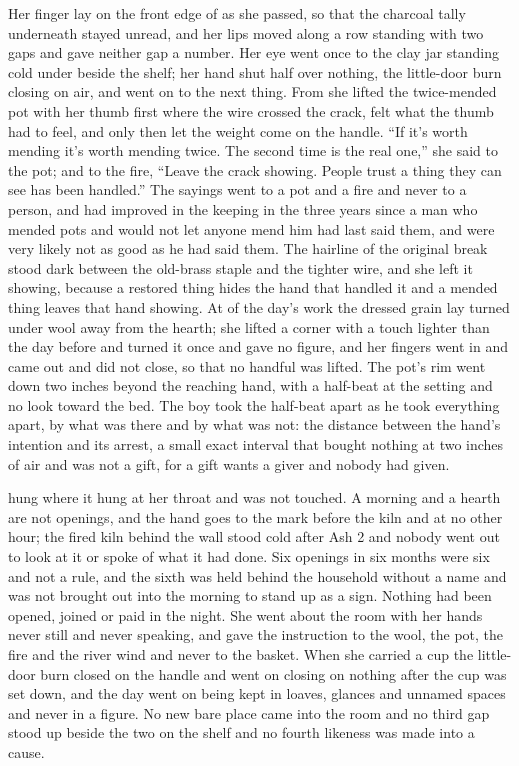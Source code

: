 Her finger lay on the front edge of  as she passed, so that the charcoal tally underneath stayed unread, and her lips moved along a row standing with two gaps and gave neither gap a number. Her eye went once to the clay jar standing cold under  beside the shelf; her hand shut half over nothing, the little-door burn closing on air, and went on to the next thing. From  she lifted the twice-mended pot with her thumb first where the wire crossed the crack, felt what the thumb had to feel, and only then let the weight come on the handle. “If it's worth mending it's worth mending twice. The second time is the real one,” she said to the pot; and to the fire, “Leave the crack showing. People trust a thing they can see has been handled.” The sayings went to a pot and a fire and never to a person, and had improved in the keeping in the three years since a man who mended pots and would not let anyone mend him had last said them, and were very likely not as good as he had said them. The hairline of the original break stood dark between the old-brass staple and the tighter wire, and she left it showing, because a restored thing hides the hand that handled it and a mended thing leaves that hand showing. At  of the day's work the dressed grain lay turned under wool away from the hearth; she lifted a corner with a touch lighter than the day before and turned it once and gave no figure, and her fingers went in and came out and did not close, so that no handful was lifted. The pot's rim went down two inches beyond the reaching hand, with a half-beat at the setting and no look toward the bed. The boy took the half-beat apart as he took everything apart, by what was there and by what was not: the distance between the hand's intention and its arrest, a small exact interval that bought nothing at two inches of air and was not a gift, for a gift wants a giver and nobody had given.

 hung where it hung at her throat and was not touched. A morning and a hearth are not openings, and the hand goes to the mark before the kiln and at no other hour; the fired kiln behind the wall stood cold after Ash 2 and nobody went out to look at it or spoke of what it had done. Six openings in six months were six and not a rule, and the sixth was held behind the household without a name and was not brought out into the morning to stand up as a sign. Nothing had been opened, joined or paid in the night. She went about the room with her hands never still and never speaking, and gave the instruction to the wool, the pot, the fire and the river wind and never to the basket. When she carried a cup the little-door burn closed on the handle and went on closing on nothing after the cup was set down, and the day went on being kept in loaves, glances and unnamed spaces and never in a figure. No new bare place came into the room and no third gap stood up beside the two on the shelf and no fourth likeness was made into a cause.

